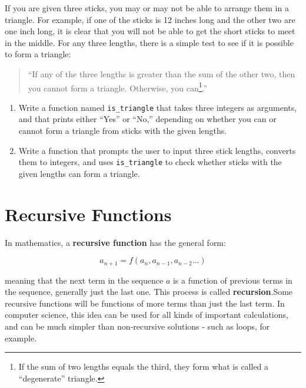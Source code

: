 \documentclass[10pt]{book}
\begin{document}
\begin{ex}

If you are given three sticks, you may or may not be able to arrange
them in a triangle.  For example, if one of the sticks is 12 inches
long and the other two are one inch long, it is clear that you will
not be able to get the short sticks to meet in the middle.  For any
three lengths, there is a simple test to see if it is possible to form
a triangle:

\begin{quotation}
``If any of the three lengths is greater than the sum of the other
  two, then you cannot form a triangle.  Otherwise, you
  can\footnote{If the sum of two lengths equals the third, they form
    what is called a ``degenerate'' triangle.}.''
\end{quotation}

\begin{enumerate}

\item Write a function named \verb"is_triangle" that takes three
  integers as arguments, and that prints either ``Yes'' or ``No,'' depending
  on whether you can or cannot form a triangle from sticks with the
  given lengths.

\item Write a function that prompts the user to input three stick
  lengths, converts them to integers, and uses \verb"is_triangle" to
  check whether sticks with the given lengths can form a triangle.

\end{enumerate}

\end{ex}


\chapter{Recursive Functions}
\label{recursion}

In mathematics, a {\bf recursive function} has the general form:

\begin{equation*}
a_{n+1} = f(a_n,a_{n-1},a_{n-2}...)
\end{equation*}

meaning that the next term in the sequence $a$ is a function 
of previous terms in the sequence, generally just the last one. 
This process is called {\bf recursion}.Some recursive functions 
will be functions of more terms than just the last term. In 
computer science, this idea can be used for all kinds of 
important calculations, and can be much simpler than 
non-recursive solutions - such as loops, for example.
\end{document}
